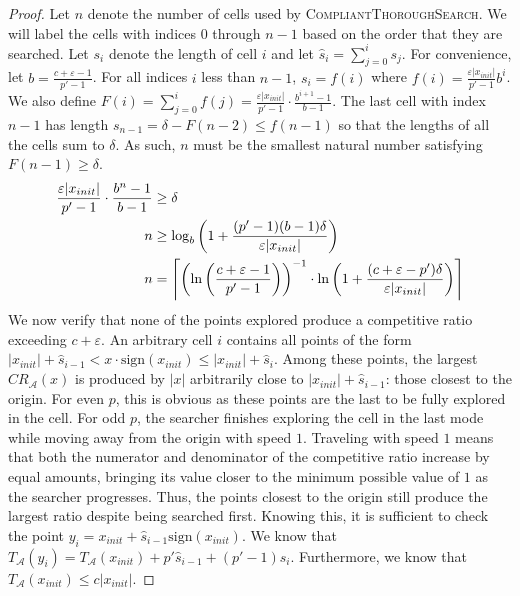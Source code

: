 \begin{appendixonly}
\begin{proof}
    Let $n$ denote the number of cells used by \textsc{CompliantThoroughSearch}. We will label the cells with indices $0$ through $n-1$ based on the order that they are searched. Let $s_i$ denote the length of cell $i$ and let $\hat{s}_i = \sum_{j=0}^{i}s_j$. For convenience, let $b=\frac{c+\varepsilon-1}{p'-1}$. For all indices $i$ less than $n-1$, $s_i=f(i)$ where $f(i) = \frac{\varepsilon |x_{init}|}{p'-1}b^i$. We also define $F(i) = \sum_{j=0}^{i}f(j) = \frac{\varepsilon |x_{init}|}{p'-1}\cdot\frac{b^{i+1}-1}{b-1}$. The last cell with index $n-1$ has length $s_{n-1}=\delta-F(n-2)\leq f(n-1)$ so that the lengths of all the cells sum to $\delta$. As such, $n$ must be the smallest natural number satisfying $F(n-1)\geq\delta$.
    \begin{align*}
        \frac{\varepsilon |x_{init}|}{p'-1}\cdot\frac{b^n-1}{b-1} &\geq \delta \\  
        n &\geq \log_b\left(1+\frac{(p'-1)(b-1)\delta}{\varepsilon |x_{init}|}\right) \\ 
        n &= \ceil*{\left(\ln\left(\frac{c+\varepsilon-1}{p'-1}\right)\right)^{-1}\cdot\ln\left(1+\frac{(c+\varepsilon-p')\delta}{\varepsilon |x_{init}|}\right)}
    \end{align*}
    We now verify that none of the points explored produce a competitive ratio exceeding $c+\varepsilon$. An arbitrary cell $i$ contains all points of the form $|x_{init}|+\hat{s}_{i-1}<x\cdot\text{sign}\left(x_{init}\right)\leq |x_{init}|+\hat{s}_{i}$.
    Among these points, the largest $CR_{\mathcal{A}}(x)$ is produced by $|x|$ arbitrarily close to $|x_{init}|+\hat{s}_{i-1}$: those closest to the origin. For even $p$, this is obvious as these points are the last to be fully explored in the cell. For odd $p$, the searcher finishes exploring the cell in the last mode while moving away from the origin with speed $1$. Traveling with speed $1$ means that both the numerator and denominator of the competitive ratio increase by equal amounts, bringing its value closer to the minimum possible value of $1$ as the searcher progresses. Thus, the points closest to the origin still produce the largest ratio despite being searched first. Knowing this, it is sufficient to check the point $y_i = x_{init}+\hat{s}_{i-1}\text{sign}\left(x_{init}\right)$. We know that $T_{\mathcal{A}}(y_i) = T_{\mathcal{A}}(x_{init}) + p'\hat{s}_{i-1} + (p'-1)s_i$. Furthermore, we know that $T_{\mathcal{A}}(x_{init})\leq c|x_{init}|$.

\end{proof}
\end{appendixonly}
